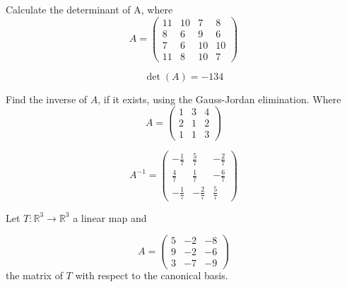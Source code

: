 \begin{questions}

\question Calculate the determinant of A, where
$$
A=\left(\begin{array}{rrrr}
11 & 10 & 7 & 8 \\
8 & 6 & 9 & 6 \\
7 & 6 & 10 & 10 \\
11 & 8 & 10 & 7
\end{array}\right)
$$

\begin{solution}
$$\det(A)=-134$$
\end{solution}

\question Find the inverse of $A$, if it exists, using the Gauss-Jordan elimination. Where
$$
A=\left(\begin{array}{rrr}
1 & 3 & 4 \\
2 & 1 & 2 \\
1 & 1 & 3
\end{array}\right)
$$

\begin{solution}
$$A^{-1}=\left(\begin{array}{rrr}
-\frac{1}{7} & \frac{5}{7} & -\frac{2}{7} \\
\frac{4}{7} & \frac{1}{7} & -\frac{6}{7} \\
-\frac{1}{7} & -\frac{2}{7} & \frac{5}{7}
\end{array}\right)$$
\end{solution}

\question Let $T:\mathbb{R}^3\rightarrow\mathbb{R}^3$  a linear map and
 
$$
A=\left(\begin{array}{rrr}
5 & -2 & -8 \\
9 & -2 & -6 \\
3 & -7 & -9
\end{array}\right)
$$
the matrix of $T$ with respect to the canonical basis.
\end{questions}
